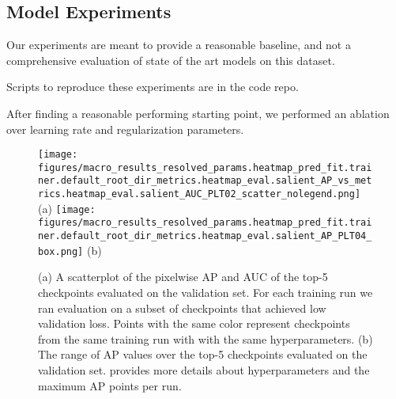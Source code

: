 \documentclass[10pt,twocolumn,letterpaper]{article}
\begin{document}


\subsection{Model Experiments}

\begin{comment}
    SeeAlso:
    ~/code/shitspotter/experiments/run_pixel_eval_pipeline.sh

    python ~/code/shitspotter/dev/poc/estimate_train_resources.py
\end{comment}

Our experiments are meant to provide a reasonable baseline, and not a
comprehensive evaluation of state of the art models on this dataset.

Scripts to reproduce these experiments are in the code repo.

After finding a reasonable performing starting point, we performed an ablation
over learning rate and regularization parameters. 

\begin{figure}[ht]
\centering
\texttt{[image: figures/macro\_results\_resolved\_params.heatmap\_pred\_fit.trainer.default\_root\_dir\_metrics.heatmap\_eval.salient\_AP\_vs\_metrics.heatmap\_eval.salient\_AUC\_PLT02\_scatter\_nolegend.png]}%
(a)
\texttt{[image: figures/macro\_results\_resolved\_params.heatmap\_pred\_fit.trainer.default\_root\_dir\_metrics.heatmap\_eval.salient\_AP\_PLT04\_box.png]}%
(b)
\caption[]{
    (a) A scatterplot of the pixelwise AP and AUC of the top-5 checkpoints evaluated on the validation set.
    For each training run we ran evaluation on a subset of checkpoints that
    achieved low validation loss.
    Points with the same color represent checkpoints from the same training run
    with with the same hyperparameters.
    (b) The range of AP values over the top-5 checkpoints evaluated on the validation set.
     provides more details about
    hyperparameters and the maximum AP points per run.
}
\label{fig:apauc_scatter}
\end{figure}
\end{document}
